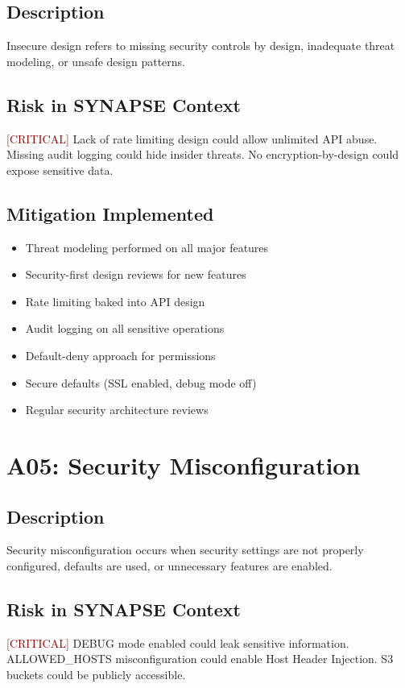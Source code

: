 \documentclass{report}
\begin{document}
\subsection{Description}
Insecure design refers to missing security controls by design, inadequate threat modeling, or unsafe design patterns.

\subsection{Risk in SYNAPSE Context}
\textcolor{darkred}{[CRITICAL]} Lack of rate limiting design could allow unlimited API abuse. Missing audit logging could hide insider threats. No encryption-by-design could expose sensitive data.

\subsection{Mitigation Implemented}
\begin{itemize}
\item Threat modeling performed on all major features
\item Security-first design reviews for new features
\item Rate limiting baked into API design
\item Audit logging on all sensitive operations
\item Default-deny approach for permissions
\item Secure defaults (SSL enabled, debug mode off)
\item Regular security architecture reviews
\end{itemize}

\section{A05: Security Misconfiguration}

\subsection{Description}
Security misconfiguration occurs when security settings are not properly configured, defaults are used, or unnecessary features are enabled.

\subsection{Risk in SYNAPSE Context}
\textcolor{darkred}{[CRITICAL]} DEBUG mode enabled could leak sensitive information. ALLOWED\_HOSTS misconfiguration could enable Host Header Injection. S3 buckets could be publicly accessible.
\end{document}
